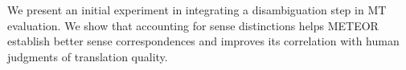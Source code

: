 We present an initial experiment in integrating a disambiguation step in MT evaluation. We show that accounting for sense distinctions helps METEOR establish better sense correspondences and improves its correlation with human judgments of translation quality.

